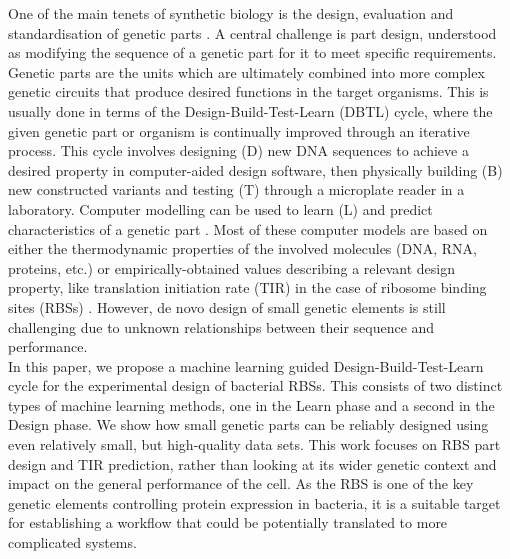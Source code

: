 \documentclass{article}
\begin{document}
One of the main tenets of synthetic biology is the design, evaluation and standardisation of genetic parts \cite{Brophy2014,Canton2008,Stanton2014}.
A central challenge is part design, understood as modifying the sequence of a genetic part for it to meet specific requirements.
Genetic parts are the units which are ultimately combined into more complex genetic circuits that produce desired functions in the target organisms.
This is usually done in terms of the Design-Build-Test-Learn (DBTL) cycle, where the given genetic part or organism is continually improved through an iterative process.
This cycle involves designing (D) new DNA sequences to achieve a desired property in computer-aided design software, then physically building (B) new constructed variants and testing (T) through a microplate reader in a laboratory.
Computer modelling can be used to learn (L) and predict characteristics of a genetic part \cite{Yeoh2019,Nielsen2016}.
Most of these computer models are based on either the thermodynamic properties of the involved molecules (DNA, RNA, proteins, etc.) or empirically-obtained values describing a relevant design property, like translation initiation rate (TIR) in the case of ribosome binding sites (RBSs) \cite{Xia1998,Chen2013,Reeve2014}.
However, de novo design of small genetic elements is still challenging due to unknown relationships between their sequence and performance.\\

In this paper, we propose a machine learning guided Design-Build-Test-Learn cycle
for the experimental design of bacterial RBSs. This consists of two distinct
types of machine learning methods, one in the Learn phase and a second in the
Design phase.
We show how small genetic parts can be reliably designed using even relatively small, but high-quality data sets.
This work focuses on RBS part design and TIR prediction, rather than looking at its wider genetic context and impact on the general performance of the cell.
As the RBS is one of the key genetic elements controlling protein expression in bacteria,
it is a suitable target for establishing a workflow that could be potentially translated to more complicated systems.\\
\end{document}
